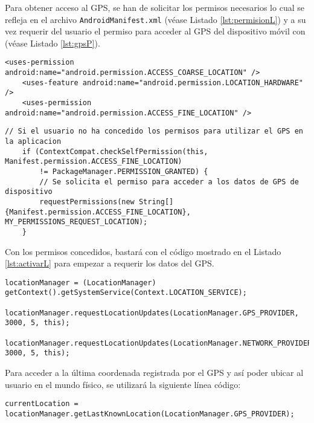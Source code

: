 Para obtener acceso al GPS, se han de solicitar los permisos necesarios lo cual se refleja en el archivo \texttt{AndroidManifest.xml} (véase Listado \ref{lst:permisionL}) y a su vez requerir del usuario el permiso para acceder al GPS del dispositivo móvil con \ULLAR{}  (véase Listado \ref{lst:gpsP}).

\begin{lstlisting}[caption={Fichero \texttt{AndroidManifest.xml} del proyecto, permisos para acceder a la ubicación del dispositivo.}, label={lst:permisionL}]
    <uses-permission android:name="android.permission.ACCESS_COARSE_LOCATION" />
    <uses-feature android:name="android.permission.LOCATION_HARDWARE" />
    <uses-permission android:name="android.permission.ACCESS_FINE_LOCATION" />
\end{lstlisting}

\begin{lstlisting}[caption={Código para que el usuario conceda permiso para acceder a la ubicacióndel dispositivo.}, label={lst:gpsP}]
    // Si el usuario no ha concedido los permisos para utilizar el GPS en la aplicacion
    if (ContextCompat.checkSelfPermission(this, Manifest.permission.ACCESS_FINE_LOCATION)
        != PackageManager.PERMISSION_GRANTED) { 
        // Se solicita el permiso para acceder a los datos de GPS de dispositivo 
        requestPermissions(new String[]{Manifest.permission.ACCESS_FINE_LOCATION},                  MY_PERMISSIONS_REQUEST_LOCATION);  
    }
\end{lstlisting}

Con los permisos concedidos, bastará con el código mostrado en el Listado \ref{lst:activarL} para empezar a requerir los datos del GPS.

\bigskip
\bigskip

\begin{lstlisting}[caption={Código para activar el GPS del dispositivo.}, label={lst:activarL}]
    locationManager = (LocationManager) getContext().getSystemService(Context.LOCATION_SERVICE);
    locationManager.requestLocationUpdates(LocationManager.GPS_PROVIDER, 3000, 5, this);
    locationManager.requestLocationUpdates(LocationManager.NETWORK_PROVIDER, 3000, 5, this);
\end{lstlisting}

Para acceder a la última coordenada registrada por el GPS y así poder ubicar al usuario en el mundo físico, se utilizará la siguiente línea código:

\begin{lstlisting}[label={lst:ubicacionL}]
    currentLocation = locationManager.getLastKnownLocation(LocationManager.GPS_PROVIDER);
\end{lstlisting}

